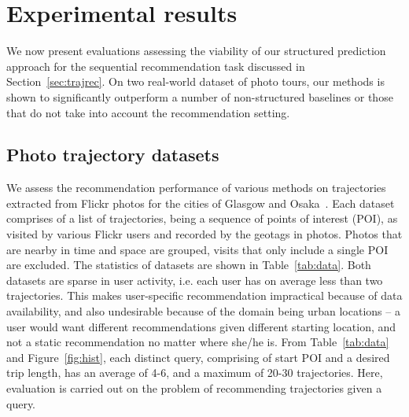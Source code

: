 
\section{Experimental results}
\label{sec:experiment}

We now present evaluations assessing the viability of our structured prediction approach
for the sequential recommendation task discussed in Section~\ref{sec:trajrec}. 
On two real-world dataset of photo tours, our methods is shown to significantly outperform 
a number of non-structured baselines or those that do not take into account the recommendation setting. 


%
\subsection{Photo trajectory datasets}
\label{sec:dataset}

We assess the recommendation performance %
of various methods
on trajectories extracted from Flickr photos
for the cities of Glasgow and Osaka~\cite{thomee2016yfcc100m,ijcai15}.
Each dataset comprises of a
list of trajectories, being a sequence of points of interest (POI), as visited by various Flickr users 
and recorded by the geotags in photos. Photos that are nearby in time and space are grouped, 
visits that only include a single POI are excluded. 
The statistics of datasets are shown in Table~\ref{tab:data}. 
Both datasets are sparse in user activity, 
i.e. each user has on average less than two trajectories. 
This makes user-specific recommendation impractical because of
data availability, and also undesirable because of the domain being urban locations 
-- a user would want different recommendations 
given different starting location, and not a static recommendation no matter where she/he is. 
From Table~\ref{tab:data} and Figure~\ref{fig:hist}, 
each distinct query, comprising of start POI and a desired trip length, 
has an average of 4-6, and a maximum of 20-30 trajectories.
Here, evaluation is carried out on the problem of recommending trajectories given a query. 


